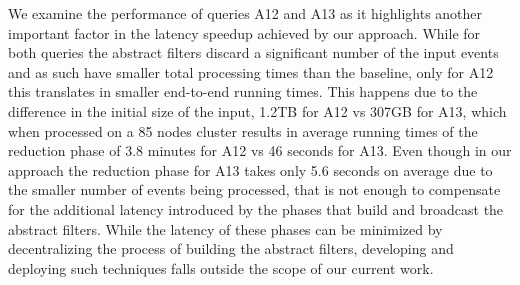 We examine the performance of queries A12 and A13 as it highlights another
important factor in the latency speedup achieved by our approach.
While for both queries the abstract filters discard a significant number of the
input events and as such have smaller total processing times than the baseline,
only for A12 this translates in smaller end-to-end running times.
This happens due to the difference in the initial size of the input, 1.2TB for
A12 vs 307GB for A13, which when processed on a 85 nodes cluster results in
average running times of the reduction phase of 3.8 minutes for A12 vs 46
seconds for A13. 
Even though in our approach the reduction phase for A13 takes only 5.6 seconds
on average due to the smaller number of events being processed, that is not
enough to compensate for the additional latency introduced by the phases that
build and broadcast the abstract filters.
While the latency of these phases can be minimized by decentralizing the process
of building the abstract filters, developing and deploying such techniques falls 
outside the scope of our current work.

















